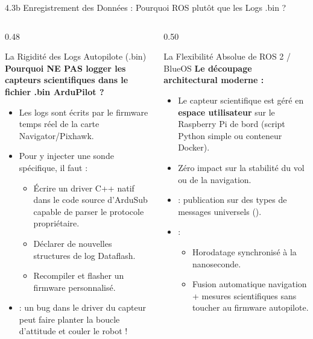\begin{frame}{4.3b Enregistrement des Données : Pourquoi ROS plutôt que les Logs .bin ?}
  \begin{columns}[T]
    \begin{column}{0.48\textwidth}
      \begin{alertblock}{La Rigidité des Logs Autopilote (.bin)}
        \scriptsize
        \textbf{Pourquoi NE PAS logger les capteurs scientifiques dans le fichier .bin ArduPilot ?}
        \begin{itemize}
          \item Les logs  sont écrits par le firmware temps réel de la carte Navigator/Pixhawk.
          \item Pour y injecter une sonde spécifique, il faut :
            \begin{itemize}\scriptsize
              \item Écrire un driver C++ natif dans le code source d'ArduSub capable de parser le protocole propriétaire.
              \item Déclarer de nouvelles structures de log Dataflash.
              \item Recompiler et flasher un firmware personnalisé.
            \end{itemize}
          \item {} : un bug dans le driver du capteur peut faire planter la boucle d'attitude et couler le robot !
        \end{itemize}
      \end{alertblock}
    \end{column}

    \begin{column}{0.50\textwidth}
      \begin{exampleblock}{La Flexibilité Absolue de ROS 2 / BlueOS}
        \scriptsize
        \textbf{Le découpage architectural moderne :}
        \begin{itemize}
          \item Le capteur scientifique est géré en \textbf{espace utilisateur} sur le Raspberry Pi de bord (script Python simple ou conteneur Docker).
          \item Zéro impact sur la stabilité du vol ou de la navigation.
          \item {} : publication sur des types de messages universels ().
          \item {} :
            \begin{itemize}\scriptsize
              \item Horodatage synchronisé à la nanoseconde.
              \item Fusion automatique navigation + mesures scientifiques sans toucher au firmware autopilote.
            \end{itemize}
        \end{itemize}
      \end{exampleblock}
    \end{column}
  \end{columns}
\end{frame}

